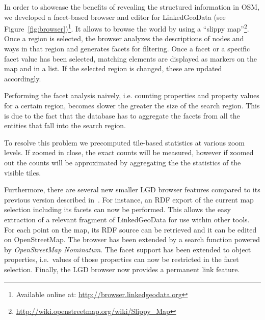 In order to showcase the benefits of revealing the structured information in OSM,
we developed a facet-based browser and editor for
LinkedGeoData (see Figure~\ref{fig:browser})\footnote{Available online at: \url{http://browser.linkedgeodata.org}}.
It allows to browse the world by using a
``slippy map''\footnote{\url{http://wiki.openstreetmap.org/wiki/Slippy_Map}}.
Once a region is selected, the browser analyzes the descriptions of nodes and ways in that region and generates facets for filtering. Once a facet or a specific facet value has been
selected, matching elements are displayed as markers on the map and in a list.
If the selected region is changed, these are updated accordingly.

Performing the facet analysis naively, i.e. counting properties and property values
for a certain region, becomes slower the greater the size of 
the search region. This is due to the fact that the database has to
aggregate the facets from all the entities that fall into the search region.

To resolve this problem we precomputed tile-based statistics at various zoom
levels. If zoomed in close, the exact counts will be
measured, however if zoomed out the counts will be approximated by aggregating
the the statistics of the visible tiles.

Furthermore, there are several new smaller LGD browser features compared to its previous version described in~\cite{linkedgeodata}. For instance, an RDF export of the current map selection including its facets can now be performed.
This allows the easy extraction of a relevant fragment of LinkedGeoData for use
within other tools. For each point on the map, its RDF source can be retrieved and it can be edited on OpenStreetMap. The browser has been extended by a search function powered by \emph{OpenStreetMap Nominatum}. The facet support has been extended to object properties, i.e.~values of those properties can now be restricted in the facet selection. Finally, the LGD browser now provides a permanent link feature.



 

